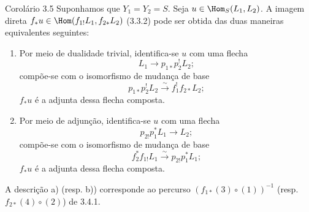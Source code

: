 \begin{statement}{Corolário 3.5}
Suponhamos que $Y_1=Y_2=S$. Seja $u\in\Hom_S(L_1,L_2)$. A imagem direta $f_*u\in\Hom(f_{1!}L_1,f_{2*}L_2)$ (3.3.2) pode ser obtida das duas maneiras equivalentes seguintes:
\end{statement}
\begin{enumerate}[label=\alph*)]
\item Por meio de dualidade trivial, identifica-se $u$ com uma flecha
\[
L_1\longrightarrow p_{1*}p_2^!L_2;
\]
compõe-se com o isomorfismo de mudança de base
\[
p_{1*}p_2^!L_2\xrightarrow{\sim}f_1^!f_{2*}L_2;
\]
$f_*u$ é a adjunta dessa flecha composta.
\item Por meio de adjunção, identifica-se $u$ com uma flecha
\[
p_{2!}p_1^*L_1\longrightarrow L_2;
\]
compõe-se com o isomorfismo de mudança de base
\[
f_2^*f_{1!}L_1\xrightarrow{\sim}p_{2!}p_1^*L_1;
\]
$f_*u$ é a adjunta dessa flecha composta.
\end{enumerate}
A descrição a) (resp. b)) corresponde ao percurso $(f_{1*}(3)\circ(1))^{-1}$ (resp. $f_{2*}(4)\circ(2)$) de 3.4.1.

